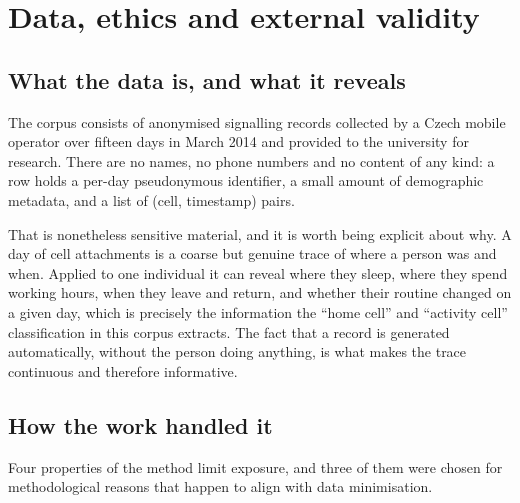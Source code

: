 \chapter{Data, ethics and external validity}
\label{app:ethics}

\section{What the data is, and what it reveals}

The corpus consists of anonymised signalling records collected by a Czech mobile
operator over fifteen days in March 2014 and provided to the university for
research. There are no names, no phone numbers and no content of any kind: a row
holds a per-day pseudonymous identifier, a small amount of demographic metadata,
and a list of (cell, timestamp) pairs.

That is nonetheless sensitive material, and it is worth being explicit about why.
A day of cell attachments is a coarse but genuine trace of where a person was and
when. Applied to one individual it can reveal where they sleep, where they spend
working hours, when they leave and return, and whether their routine changed on a
given day, which is precisely the information the ``home cell'' and ``activity
cell'' classification in this corpus extracts. The fact that a record is
generated automatically, without the person doing anything, is what makes the
trace continuous and therefore informative.

\section{How the work handled it}

Four properties of the method limit exposure, and three of them were chosen for
methodological reasons that happen to align with data minimisation.

